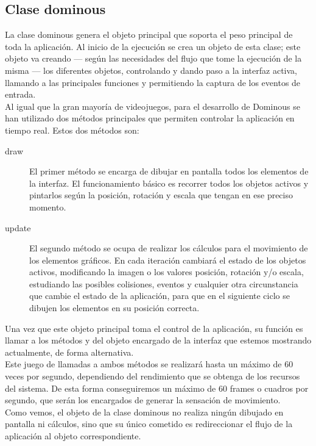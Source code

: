 \subsection{Clase dominous}

La clase dominous genera el objeto principal que soporta el peso principal de toda la aplicación. Al inicio de la
ejecución se crea un objeto de esta clase; este objeto va creando --- según las necesidades del flujo que tome
la ejecución de la misma --- los diferentes objetos, controlando y dando paso a la interfaz activa, llamando a
las principales funciones y permitiendo la captura de los eventos de entrada. \\

Al igual que la gran mayoría de videojuegos, para el desarrollo de Dominous se han utilizado dos métodos principales
que permiten controlar la aplicación en tiempo real. Estos dos métodos son:
\begin{description}
    \item[draw] El primer método se encarga de dibujar en pantalla todos los elementos de la interfaz. El funcionamiento
        básico es recorrer todos los objetos activos y pintarlos según la posición, rotación y escala que tengan en
        ese preciso momento. 
    \item[update] El segundo método se ocupa de realizar los cálculos para el movimiento de los elementos gráficos. 
        En cada iteración cambiará el estado de los objetos activos, modificando la imagen o los valores posición,
        rotación y/o escala, estudiando las posibles colisiones, eventos y cualquier otra circunstancia que cambie
        el estado de la aplicación, para que en el siguiente ciclo se dibujen los elementos en su posición correcta.
\end{description}

Una vez que este objeto principal toma el control de la aplicación, su función es llamar a los métodos 
y  del objeto encargado de la interfaz que estemos mostrando actualmente, de forma alternativa. \\

Este juego de llamadas a ambos métodos se realizará hasta un máximo de 60 veces por segundo, dependiendo del rendimiento
que se obtenga de los recursos del sistema. De esta forma conseguiremos un máximo de 60 frames o cuadros por segundo,
que serán los encargados de generar la sensación de movimiento. \\

Como vemos, el objeto de la clase dominous no realiza ningún dibujado en pantalla ni cálculos, sino que su único
cometido es redireccionar el flujo de la aplicación al objeto correspondiente.

